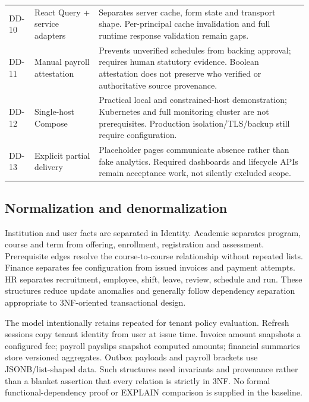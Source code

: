 \documentclass[10pt,a4paper]{article}
\begin{document}
\begin{longtable}{@{}L{16mm}L{37mm}L{107mm}@{}}
DD-10 & React Query + service adapters & Separates server cache, form state and transport shape. Per-principal cache invalidation and full runtime response validation remain gaps.\\
DD-11 & Manual payroll attestation & Prevents unverified schedules from backing approval; requires human statutory evidence. Boolean attestation does not preserve who verified or authoritative source provenance.\\
DD-12 & Single-host Compose & Practical local and constrained-host demonstration; Kubernetes and full monitoring cluster are not prerequisites. Production isolation/TLS/backup still require configuration.\\
DD-13 & Explicit partial delivery & Placeholder pages communicate absence rather than fake analytics. Required dashboards and lifecycle APIs remain acceptance work, not silently excluded scope.\\
\end{longtable}\normalsize

\subsection{Normalization and denormalization}
Institution and user facts are separated in Identity. Academic separates
program, course and term from offering, enrollment, registration and assessment.
Prerequisite edges resolve the course-to-course relationship without repeated lists.
Finance separates fee configuration from issued invoices and payment attempts.
HR separates recruitment, employee, shift, leave, review, schedule and run.
These structures reduce update anomalies and generally follow dependency separation
appropriate to 3NF-oriented transactional design.

The model intentionally retains repeated  for tenant policy
evaluation. Refresh sessions copy tenant identity from user at issue time.
Invoice amount snapshots a configured fee; payroll payslips snapshot computed amounts;
financial summaries store versioned aggregates. Outbox payloads and payroll brackets
use JSONB/list-shaped data. Such structures need invariants and provenance rather
than a blanket assertion that every relation is strictly in 3NF. No formal
functional-dependency proof or EXPLAIN comparison is supplied in the baseline.
\end{document}
